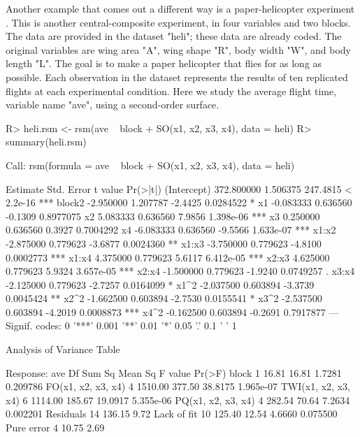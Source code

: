 \documentclass[article,nojss]{jss}
\def\rsm{\pkg{rsm}}
\begin{document}
Another example that comes out a different way is a paper-helicopter experiment \cite[Table 12.5]{Box05}.  This is another central-composite experiment, in four variables and two blocks.  The data are provided in the \rsm{} dataset "heli"; these data are already coded.  The original variables are wing area "A", wing shape "R", body width "W", and body length "L".  The goal is to make a paper helicopter that flies for as long as possible.  Each observation in the dataset represents the results of ten replicated flights at each experimental condition.  Here we study the average flight time, variable name "ave", using a second-order surface.
\begin{Schunk}
\begin{Sinput}
R> heli.rsm <- rsm(ave ~ block + SO(x1, x2, x3, x4), data = heli)
R> summary(heli.rsm)
\end{Sinput}
\begin{Soutput}
Call:
rsm(formula = ave ~ block + SO(x1, x2, x3, x4), data = heli)

              Estimate Std. Error  t value  Pr(>|t|)    
(Intercept) 372.800000   1.506375 247.4815 < 2.2e-16 ***
block2       -2.950000   1.207787  -2.4425 0.0284522 *  
x1           -0.083333   0.636560  -0.1309 0.8977075    
x2            5.083333   0.636560   7.9856 1.398e-06 ***
x3            0.250000   0.636560   0.3927 0.7004292    
x4           -6.083333   0.636560  -9.5566 1.633e-07 ***
x1:x2        -2.875000   0.779623  -3.6877 0.0024360 ** 
x1:x3        -3.750000   0.779623  -4.8100 0.0002773 ***
x1:x4         4.375000   0.779623   5.6117 6.412e-05 ***
x2:x3         4.625000   0.779623   5.9324 3.657e-05 ***
x2:x4        -1.500000   0.779623  -1.9240 0.0749257 .  
x3:x4        -2.125000   0.779623  -2.7257 0.0164099 *  
x1^2         -2.037500   0.603894  -3.3739 0.0045424 ** 
x2^2         -1.662500   0.603894  -2.7530 0.0155541 *  
x3^2         -2.537500   0.603894  -4.2019 0.0008873 ***
x4^2         -0.162500   0.603894  -0.2691 0.7917877    
---
Signif. codes:  0 '***' 0.001 '**' 0.01 '*' 0.05 '.' 0.1 ' ' 1 

Analysis of Variance Table

Response: ave
                    Df  Sum Sq Mean Sq F value    Pr(>F)
block                1   16.81   16.81  1.7281  0.209786
FO(x1, x2, x3, x4)   4 1510.00  377.50 38.8175 1.965e-07
TWI(x1, x2, x3, x4)  6 1114.00  185.67 19.0917 5.355e-06
PQ(x1, x2, x3, x4)   4  282.54   70.64  7.2634  0.002201
Residuals           14  136.15    9.72                  
Lack of fit         10  125.40   12.54  4.6660  0.075500
Pure error           4   10.75    2.69                  


\end{Soutput}
\end{Schunk}
\end{document}
